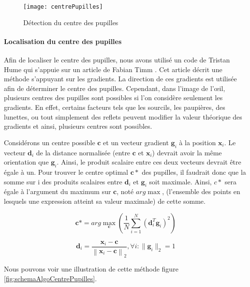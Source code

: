 \begin{figure}[H]
  \centering
  \texttt{[image: centrePupilles]}
  \caption{Détection du centre des pupilles}
  \label{fig:centrePupilles}
\end{figure}

\paragraph{Localisation du centre des pupilles}

Afin de localiser le centre des pupilles, nous avons utilisé un code de Tristan Hume \cite{eyelike} qui s’appuie sur un article de Fabian Timm \cite{timm2011accurate}. Cet article décrit une méthode s’appuyant sur les gradients. La direction de ces gradients est utilisée afin de déterminer le centre des pupilles. Cependant, dans l’image de l’œil, plusieurs centres des pupilles sont possibles si l’on considère seulement les gradients. En effet, certains facteurs tels que les sourcils, les paupières, des lunettes, ou tout simplement des reflets peuvent modifier la valeur théorique des gradients et ainsi, plusieurs centres sont possibles.

Considérons un centre possible $\mathbf{c}$ et un vecteur gradient $\mathbf{g}_i$ à la position $\mathbf{x}_i$. Le vecteur $\mathbf{d}_i$ de la distance normalisée (entre $\mathbf{c}$ et $\mathbf{x}_i$) devrait avoir la même orientation que $\mathbf{g}_i$. Ainsi, le produit scalaire entre ces deux vecteurs devrait être égale à un. Pour trouver le centre optimal $\mathbf{c}*$ des pupilles, il faudrait donc que la somme sur i des produits scalaires entre $\mathbf{d}_i$ et $\mathbf{g}_i$ soit maximale. Ainsi, $c*$ sera égale à l'argument du maximum sur $\mathbf{c}$, noté $arg \max$, (l'ensemble des points en lesquels une expression atteint sa valeur maximale) de cette somme.

\begin{equation}
\mathbf{c}* = arg\max_{\mathbf{c}}\left (\frac{1}{N}\sum_{i=1}^N(\mathbf{d}_i^T\mathbf{g}_i)^2\right )
\label{eq:1}
\end{equation}

\begin{equation}
\mathbf{d}_i = \frac{\mathbf{x}_i - \mathbf{c}}{\left \| \mathbf{x}_i - \mathbf{c} \right \|_2} , \forall i : \|\mathbf{g}_i\|_2 = 1
\label{eq:2}
\end{equation}

Nous pouvons voir une illustration de cette méthode figure \ref{fig:schemaAlgoCentrePupilles}.


